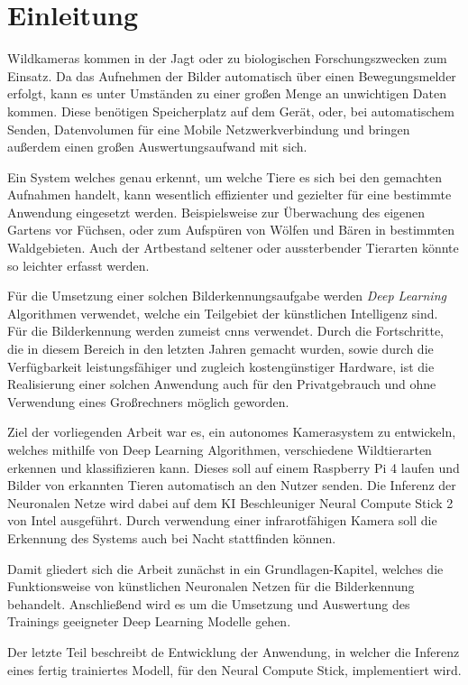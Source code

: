 \chapter{Einleitung}\label{kap:einleitung}


Wildkameras kommen in der Jagt oder zu biologischen 
Forschungszwecken zum Einsatz.
Da das Aufnehmen der Bilder automatisch über einen 
Bewegungsmelder erfolgt, kann es unter Umständen zu 
einer großen Menge an unwichtigen Daten kommen.
Diese benötigen Speicherplatz auf dem Gerät, 
oder, bei automatischem Senden, Datenvolumen 
für eine Mobile Netzwerkverbindung und bringen außerdem
einen großen Auswertungsaufwand mit sich.

Ein System welches genau erkennt, um welche Tiere es
sich bei den gemachten Aufnahmen handelt, kann wesentlich 
effizienter und gezielter für eine bestimmte Anwendung 
eingesetzt werden.
Beispielsweise zur Überwachung des eigenen Gartens vor 
Füchsen, oder zum Aufspüren von Wölfen und Bären 
in bestimmten Waldgebieten.
Auch der Artbestand seltener oder aussterbender 
Tierarten könnte so leichter erfasst werden.

Für die Umsetzung einer solchen Bilderkennungsaufgabe 
werden \textit{Deep Learning} Algorithmen verwendet,
welche ein Teilgebiet der künstlichen Intelligenz sind.
Für die Bilderkennung werden zumeist \Glspl{cnn} verwendet.
Durch die Fortschritte, die in diesem Bereich in
den letzten Jahren gemacht wurden, sowie durch 
die Verfügbarkeit leistungsfähiger und zugleich
kostengünstiger Hardware, ist die Realisierung
einer solchen Anwendung auch für den Privatgebrauch
und ohne Verwendung eines Großrechners möglich geworden.


Ziel der vorliegenden Arbeit war es, ein autonomes Kamerasystem 
zu entwickeln, welches mithilfe von Deep Learning Algorithmen, 
verschiedene Wildtierarten erkennen und klassifizieren kann.
Dieses soll auf einem Raspberry Pi 4 laufen und 
Bilder von erkannten Tieren automatisch an den Nutzer 
senden.
Die Inferenz der Neuronalen Netze wird dabei
auf dem KI Beschleuniger Neural Compute Stick 2
von Intel ausgeführt. Durch verwendung einer 
infrarotfähigen Kamera soll die Erkennung des 
Systems auch bei Nacht stattfinden können.

Damit gliedert sich die Arbeit zunächst in ein
Grundlagen-Kapitel, welches die Funktionsweise 
von künstlichen Neuronalen Netzen für die
Bilderkennung behandelt.
Anschließend wird es um die Umsetzung und Auswertung des 
Trainings geeigneter Deep Learning Modelle gehen.

Der letzte Teil beschreibt de Entwicklung der Anwendung, 
in welcher die Inferenz eines fertig trainiertes Modell, 
für den Neural Compute Stick, implementiert wird.
